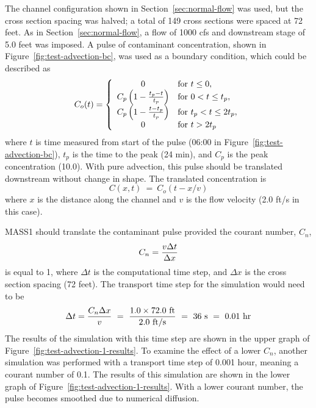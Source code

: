 \documentclass[12pt,dvips,letterpaper]{article}
\begin{document}
The channel configuration shown in Section~\ref{sec:normal-flow} was
used, but the cross section spacing was halved; a total of 149 cross
sections were spaced at 72 feet.  As in Section~\ref{sec:normal-flow},
a flow of 1000 cfs and downstream stage of 5.0 feet was imposed. A pulse
of contaminant concentration, shown in
Figure~\ref{fig:test-advection-bc}, was used as a boundary condition,
which could be described as
\begin{equation}
  \label{eq:advection-bc-conc}
  C_{o}(t) = \left\{ 
    \begin{array}[c]{cl}
      0 & \mathrm{for} ~ t \le 0, \\
      C_{p} \left( 1 - { { t_{p} - t } \over { t_{p} } } \right) &
      \mathrm{for} ~ 0 < t \le t_{p}, \\
      C_{p} \left( 1 - { { t - t_{p} } \over { t_{p} } } \right) &
      \mathrm{for} ~ t_{p} < t \le 2 t_{p}, \\
      0 & \mathrm{for} ~ t > 2 t_{p}
    \end{array} 
  \right.   
\end{equation}
where $t$ is time measured from start of the pulse (06:00 in
Figure~\ref{fig:test-advection-bc}), $t_{p}$ is the time to the peak
(24 min), and $C_{p}$ is the peak concentration (10.0).  With pure
advection, this pulse should be translated downstream without change in
shape.  The translated concentration is
\[
  C(x, t) ~ = ~ C_{o}(t - x/v)
\]
where $x$ is the distance along the channel and $v$ is the flow
velocity (2.0 ft/s in this case).  

MASS1 should translate the contaminant pulse provided the courant
number, $C_{n}$,
\begin{equation}
  \label{eq:courant-number}
  C_{n} = { { v \Delta t } \over { \Delta x } }
\end{equation}
is equal to 1, where $\Delta t$ is the computational time step, and
$\Delta x$ is the cross section spacing (72 feet). The transport time
step for the simulation would need to be
\[
\Delta t = { { C_{n} \Delta x } \over v } ~ = ~ {{ 1.0 \times 72.0 ~
    \mathrm{ft}} \over {2.0 ~ \mathrm{ft} \slash \mathrm{s} }} ~ = ~
    36 ~\mathrm{s} ~ = ~ 0.01 ~ \mathrm{hr}
\]
The results of the simulation with this time step are shown in the
upper graph of Figure~\ref{fig:test-advection-1-results}.  To examine
the effect of a lower $C_{n}$, another simulation was performed with a
transport time step of 0.001 hour, meaning a courant number of 0.1.
The results of this simulation are shown in the lower graph of
Figure~\ref{fig:test-advection-1-results}.  With a lower courant
number, the pulse becomes smoothed due to numerical diffusion.  
\end{document}
